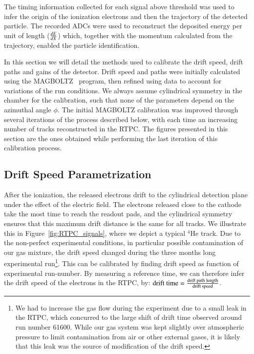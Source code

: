 \documentclass[preprint,5p]{elsarticle}
\begin{document}
The timing information collected for each signal above threshold
was used to infer the origin of the ionization electrons and 
then the trajectory of the detected particle. The recorded ADCs were used to reconstruct 
the deposited energy per unit of length ($\small{\frac{dE}{dX}}$) which, 
together with the momentum calculated from the trajectory, enabled the particle 
identification. 

In this section we will detail the methods used to calibrate the drift speed,
drift paths and gains of the detector. Drift speed and paths were initially
calculated using the MAGBOLTZ~\cite{Biagi:1999nwa} program, then refined using
data to account for variations of the run conditions. We always assume 
cylindrical symmetry in the chamber for the calibration, such that none of
the parameters depend on the azimuthal angle $\phi$. The initial MAGBOLTZ
calibration was improved through several iterations of the
process described below, with each time an increasing number of tracks 
reconstructed in the RTPC. The figures presented in this section
are the ones obtained while performing the last iteration of this
calibration process.

\subsection{Drift Speed Parametrization}

After the ionization, the released electrons drift to the cylindrical detection 
plane under the effect of the electric field. The electrons released close to 
the cathode take the most time to reach the readout pads, and the cylindrical 
symmetry ensures that this maximum drift distance is the same for all tracks.  
We illustrate this in Figure~\ref{fig:RTPC_signals}, where we depict a typical 
$^{4}$He track. Due to the non-perfect experimental conditions, in particular 
possible contamination of our gas mixture, the drift speed changed during the 
three months long experimental run\footnote{We had to increase the gas flow 
   during the experiment due to a small leak in the RTPC, which concurred to 
   the large shift of drift time observed around run number 61600. While our 
   gas system was kept slightly over atmospheric pressure to limit 
contamination from air or other external gases, it is likely that this leak was 
the source of modification of the drift speed.}. This can be calibrated by 
finding drift speed as function of experimental run-number. By measuring a 
reference time, we can therefore infer the drift speed of the electrons in the 
RTPC, by: $\textnormal{drift time} = \frac{\textnormal{drift path 
length}}{\textnormal{drift speed}}$.
\end{document}
